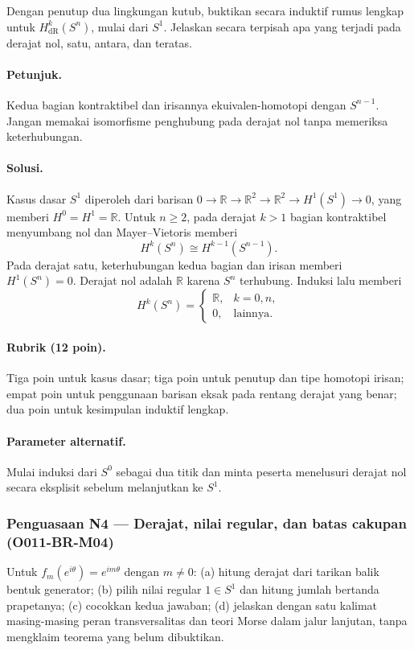 Dengan penutup dua lingkungan kutub, buktikan secara induktif rumus lengkap
untuk $H^k_{\mathrm{dR}}(S^n)$, mulai dari $S^1$. Jelaskan secara terpisah apa
yang terjadi pada derajat nol, satu, antara, dan teratas.

\paragraph{Petunjuk.}
Kedua bagian kontraktibel dan irisannya ekuivalen-homotopi dengan
$S^{n-1}$. Jangan memakai isomorfisme penghubung pada derajat nol tanpa
memeriksa keterhubungan.

\paragraph{Solusi.}
Kasus dasar $S^1$ diperoleh dari barisan
$0\to\mathbb R\to\mathbb R^2\to\mathbb R^2\to H^1(S^1)\to0$,
yang memberi $H^0=H^1=\mathbb R$. Untuk $n\ge2$, pada derajat $k>1$ bagian
kontraktibel menyumbang nol dan Mayer--Vietoris memberi
\[
 H^k(S^n)\cong H^{k-1}(S^{n-1}).
\]
Pada derajat satu, keterhubungan kedua bagian dan irisan memberi $H^1(S^n)=0$.
Derajat nol adalah $\mathbb R$ karena $S^n$ terhubung. Induksi lalu memberi
\[
 H^k(S^n)=\begin{cases}\mathbb R,&k=0,n,\\0,&\text{lainnya}.
 \end{cases}
\]

\paragraph{Rubrik (12 poin).}
Tiga poin untuk kasus dasar; tiga poin untuk penutup dan tipe homotopi irisan;
empat poin untuk penggunaan barisan eksak pada rentang derajat yang benar;
dua poin untuk kesimpulan induktif lengkap.

\paragraph{Parameter alternatif.}
Mulai induksi dari $S^0$ sebagai dua titik dan minta peserta menelusuri
derajat nol secara eksplisit sebelum melanjutkan ke $S^1$.

\subsubsection*{Penguasaan N4 — Derajat, nilai regular, dan batas cakupan (O011-BR-M04)}
\label{o011-br-m04}

Untuk $f_m(e^{i\theta})=e^{im\theta}$ dengan $m\ne0$: (a) hitung derajat dari
tarikan balik bentuk generator; (b) pilih nilai regular $1\in S^1$ dan hitung
jumlah bertanda prapetanya; (c) cocokkan kedua jawaban; (d) jelaskan dengan
satu kalimat masing-masing peran transversalitas dan teori Morse dalam jalur
lanjutan, tanpa mengklaim teorema yang belum dibuktikan.

